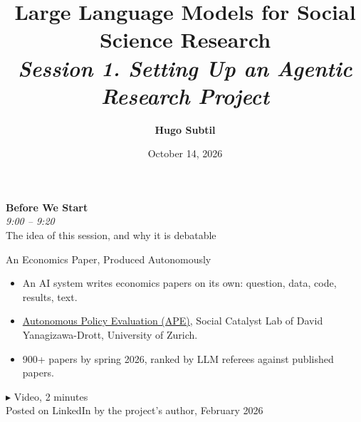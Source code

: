 \documentclass[svgnames,x11names,dvipsnames]{beamer}
\title[LLMs for Social Science Research]{\large \textbf{Large Language Models for Social Science Research} \\
    \textit{Session 1. Setting Up an Agentic Research Project}}
\author[H. Subtil]{\textbf{Hugo Subtil}}
\institute{PhD Workshop, University of Zurich}
\date{October 14, 2026}
\begin{document}
\frame{\titlepage}


\begin{frame}[plain]
  \centering
  \vfill
  {\LARGE \textbf{\textcolor{titleblue}{Before We Start}}}\\[0.4cm]
  {\large \textit{9:00 -- 9:20}}\\[0.3cm]
  {The idea of this session, and why it is debatable}
  \vfill
\end{frame}

\begin{frame}{An Economics Paper, Produced Autonomously}

\vspace{0.3cm}

\begin{itemize}
    \item An AI system writes economics papers on its own: question, data, code, results, text.
    \vspace{0.2cm}
    \item \href{https://ape.socialcatalystlab.org}{\textcolor{titleblue}{Autonomous Policy Evaluation (APE)}}, Social Catalyst Lab of David Yanagizawa-Drott, University of Zurich.
    \vspace{0.2cm}
    \item 900+ papers by spring 2026, ranked by LLM referees against published papers.
\end{itemize}

\vspace{0.8cm}

\centering
{\Large \textcolor{titleblue}{$\blacktriangleright$} Video, 2 minutes}\\[0.2cm]
{\footnotesize Posted on LinkedIn by the project's author, February 2026}

\end{frame}
\end{document}
